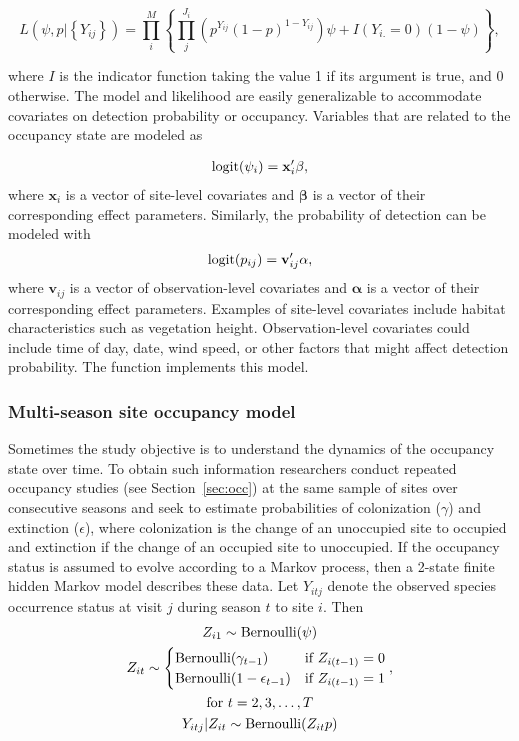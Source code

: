 \documentclass[article,shortnames]{jss}
\DeclareMathOperator{\logit}{logit}
\DeclareMathOperator{\Bern}{Bernoulli}
\begin{document}
\begin{equation}
L(\psi, p | \left\{Y_{ij}\right\}) = 
 \prod_{i}^{M} \left\{
    \prod_{j}^{J_i} 
      \left(p^{Y_{ij}}(1-p)^{1-Y_{ij}}\right)
          \psi + I(Y_{i.}=0)(1-\psi) \right\},  
\end{equation}

where $I$ is the indicator function taking the value 1 if its argument is 
true, and 0 otherwise. The model and likelihood are easily generalizable to 
accommodate covariates on detection probability or occupancy.
Variables that are related to the occupancy state are modeled as

\begin{gather}
  \logit(\psi_i) = \mathbf x_i' \mathbf \beta, \notag
\end{gather}
where $\mathbf x_i$ is a vector of site-level covariates and $\mathbf \beta$
is a vector of their corresponding effect parameters.  Similarly, the
probability of detection can be modeled with
\begin{gather}
  \logit(p_{ij}) = \mathbf v_{ij}' \mathbf \alpha, \notag
\end{gather}
where $\mathbf v_{ij}$ is a vector of observation-level covariates and
$\mathbf \alpha$ is a vector of their corresponding effect parameters.  
Examples of site-level covariates include habitat characteristics such as 
vegetation height. Observation-level covariates could include time of day, 
date, wind speed, or other factors that might affect detection probability. 
The function  implements this model.


\subsubsection{Multi-season site occupancy model} 

Sometimes the study objective is to understand the dynamics of the 
occupancy state over time. To obtain such information researchers conduct 
repeated occupancy studies (see Section~\ref{sec:occ}) at the same sample of 
sites over consecutive seasons \citep{MacKenzie2003} and seek to estimate
probabilities of colonization ($\gamma$) and extinction
($\epsilon$), where colonization is the change of an unoccupied
site to occupied and extinction if the change of an occupied site to
unoccupied.  If the occupancy status is assumed to evolve according to
a Markov process, then a 2-state finite hidden Markov model describes
these data.  Let $Y_{itj}$ denote the observed species occurrence
status at visit $j$ during season $t$ to site $i$.  Then
\begin{gather}
  Z_{i1} \sim \Bern(\psi) \notag \\
  Z_{it} \sim
  \begin{cases}
    \Bern(\gamma_{t-1}) & \text{if $Z_{i(t-1)} = 0$} \notag \\
    \Bern(1-\epsilon_{t-1}) & \text{if $Z_{i(t-1)} = 1$}
  \end{cases}, \\
  \text{for $t=2,3,\dots,T$} \notag \\
  Y_{itj} | Z_{it} \sim \Bern(Z_{it} p) \notag
\end{gather}
\end{document}
